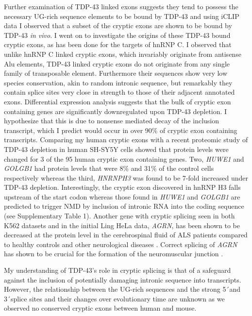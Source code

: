 Further examination of TDP-43 linked exons suggests they tend to possess the necessary UG-rich sequence elements to be bound by TDP-43 and using iCLIP data I observed that a subset of the cryptic exons are shown to be bound by TDP-43 \emph{in vivo}. I went on to investigate the origins of these TDP-43 bound cryptic exons, as has been done for the targets of hnRNP C. I observed that unlike hnRNP C linked cryptic exons, which invariably originate from antisense Alu elements, TDP-43 linked cryptic exons do not originate from any single family of transposable element. Furthermore their sequences show very low species conservation, akin to random intronic sequence, but remarkably they contain splice sites very close in strength to those of their adjacent annotated exons. Differential expression analysis suggests that the bulk of cryptic exon containing genes are significantly downregulated upon TDP-43 depletion. I hypothesize that this is due to nonsense mediated decay of the inclusion transcript, which I predict would occur in over 90\% of cryptic exon containing transcripts. Comparing my human cryptic exons with a recent proteomic study of TDP-43 depletion in human SH-SY5Y cells \citep{Stalekar2015-qd} showed that protein levels were changed for 3 of the 95 human cryptic exon containing genes. Two, \emph{HUWE1} and \emph{GOLGB1} had protein levels that were 8\% and 31\% of the control cells respectively whereas the third, \emph{HNRNPH3} was found to be 7-fold increased under TDP-43 depletion. Interestingly, the cryptic exon discovered in hnRNP H3 falls upstream of the start codon whereas those found in \emph{HUWE1} and \emph{GOLGB1} are predicted to trigger NMD by inclusion of intronic RNA into the coding sequence (see Supplementary Table 1).  Another gene with cryptic splicing seen in both K562 datasets and in the initial Ling HeLa data, \emph{AGRN}, has been shown to be decreased at the protein level in the cerebrospinal fluid of ALS patients compared to healthy controls and other neurological diseases \citep{Collins2015-xd}. Correct splicing of \emph{AGRN} has shown to be crucial for the formation of the neuromuscular junction \citep{Ruggiu2009-qx}.

My understanding of TDP-43's role in cryptic splicing is that of a safeguard against the inclusion of potentially damaging intronic sequence into transcripts. However, the relationship between the UG-rich sequences and the strong 5\'\ and 3\'\ splice sites and their changes over evolutionary time are unknown as we observed no conserved cryptic exons between human and mouse. 

